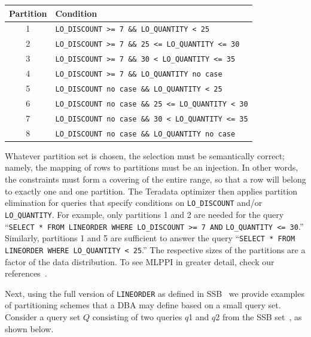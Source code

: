 \documentclass[runningheads]{comsis2}
\begin{document}
\begin{center}
\begin{tabular}{|c|p{6cm}|}\hline 
Partition & Condition \\ \hline
1		& {\scriptsize  {\tt LO\_DISCOUNT >= 7 \&\& LO\_QUANTITY < 25}} \\ \hline
2		& {\scriptsize  {\tt LO\_DISCOUNT >= 7 \&\& 25 <= LO\_QUANTITY <= 30}} \\ \hline
3		& {\scriptsize {\tt LO\_DISCOUNT >= 7 \&\& 30 < LO\_QUANTITY <= 35}} \\ \hline
4		& {\scriptsize {\tt LO\_DISCOUNT >= 7 \&\& LO\_QUANTITY no case}}\\ \hline
5       & {\scriptsize {\tt LO\_DISCOUNT no case \&\& LO\_QUANTITY < 25}} \\ \hline 
6		& {\scriptsize {\tt LO\_DISCOUNT no case \&\& 25 <= LO\_QUANTITY < 30}} \\\hline								  	        
7		& {\scriptsize {\tt LO\_DISCOUNT no case \&\& 30 < LO\_QUANTITY <= 35}} \\ \hline
8		& {\scriptsize  {\tt LO\_DISCOUNT no case \&\& LO\_QUANTITY no case}} \\ \hline
\end{tabular}
\end{center}

Whatever partition set is chosen, 
the selection must be semantically correct; namely, 
the mapping of rows to partitions must be an injection. 
In other words, the constraints must form a covering of 
the entire range, so that a row will belong to exactly one and one partition. 
The Teradata optimizer then applies \hbox{partition} elimination for queries 
that specify conditions on {\tt LO\_DISCOUNT} and/or {\tt LO\_QUANTITY}. 
For \hbox{example}, only partitions 1 and 2 are needed for the query 
``{\tt SELECT * FROM LINEORDER WHERE LO\_DISCOUNT >= 7 AND} {\tt LO\_QUANTITY <= 30}.'' 
Similarly, partitions 1 and 5 are sufficient to answer the query 
``{\tt SELECT * FROM LINEORDER WHERE LO\_QUANTITY < 25}.'' 
\linebreak The respective sizes of the partitions are a factor of the data distribution. 
To see MLPPI in greater detail, check our references~\cite{sinclair:ppi,klindt09mlppi}. 

Next, using the full version of {\tt LINEORDER} as defined in SSB~\cite{oneil:ssb} 
we provide examples of partitioning schemes that 
a DBA may define based on a small query set. 
Consider a query set $Q$ consisting of two queries $q$1 and $q$2 from the SSB set~\cite{oneil:ssb}, as shown below.
\end{document}
